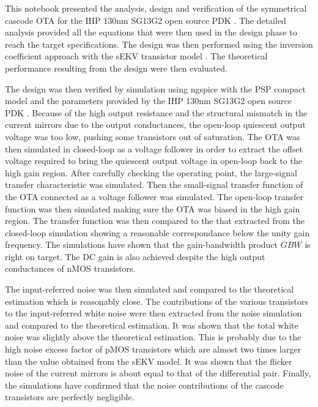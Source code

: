 \documentclass[
  a4paper,
  DIV=11,
  numbers=noendperiod]{scrreprt}
\begin{document}
This notebook presented the analysis, design and verification of the
symmetrical cascode OTA
 for the IHP 130nm
SG13G2 open source PDK . The
detailed analysis provided all the equations that were then used in the
design phase to reach the target specifications. The design was then
performed using the inversion coefficient approach with the sEKV
transistor model 
. The theoretical
performance resulting from the design were then evaluated.

The design was then verified by simulation using ngspice with the PSP
compact model  and the
parameters provided by the IHP 130nm SG13G2 open source PDK
. Because of the high output
resistance and the structural mismatch in the current mirrors due to the
output conductances, the open-loop quiescent output voltage was too low,
pushing some transistors out of saturation. The OTA was then simulated
in closed-loop as a voltage follower in order to extract the offset
voltage required to bring the quiescent output voltage in open-loop back
to the high gain region. After carefully checking the operating point,
the large-signal transfer characteristic was simulated. Then the
small-signal transfer function of the OTA connected as a voltage
follower was simulated. The open-loop transfer function was then
simulated making sure the OTA was biased in the high gain region. The
transfer function was then compared to the that extracted from the
closed-loop simulation showing a reasonable correspondance below the
unity gain frequency. The simulations have shown that the gain-bandwidth
product \(GBW\) is right on target. The DC gain is also achieved despite
the high output conductances of nMOS transistors.

The input-referred noise was then simulated and compared to the
theoretical estimation which is reasonably close. The contributions of
the various transistors to the input-referred white noise were then
extracted from the noise simulation and compared to the theoretical
estimation. It was shown that the total white noise was slightly above
the theoretical estimation. This is probably due to the high noise
excess factor of pMOS transistors which are almost two times larger than
the value obtained from the sEKV model. It was shown that the flicker
noise of the current mirrors is about equal to that of the differential
pair. Finally, the simulations have confirmed that the noise
contributions of the cascode transistors are perfectly negligible.
\end{document}
